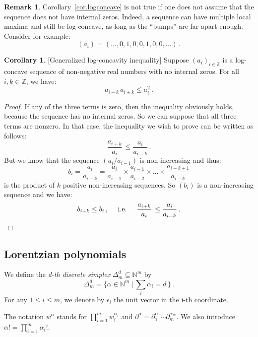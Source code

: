 \documentclass[12pt,reqno]{amsart}
\theoremstyle{definition}
\newtheorem{remark}[theorem]{Remark}
\newtheorem{corollary}[theorem]{Corollary}
\begin{document}
\begin{remark}
    Corollary~\ref{cor.logconcave} is not true if one does not assume that the sequence does not have internal zeros. Indeed, a sequence can have multiple local maxima and still be log-concave, as long as the ``bumps'' are far apart enough. Consider for example:
    $$
    (a_{i}) = ( \ldots , 0, 1 , 0 , 0 , 1 , 0 , 0 , \ldots )\,.
    $$
\end{remark}

\begin{corollary}\label{generalizedlogconcavity}[Generalized log-concavity inequality]
    Suppose $(a_{i})_{i \in \mathbb{Z}}$ is a log-concave sequence of non-negative real numbers with no internal zeros. For all $i,k \in \mathbb{Z}$, we have:
    $$
    a_{i-k} \, a_{i+k} \leq a_i^2\,.
    $$
\end{corollary}

\begin{proof}
   If any of the three terms is zero, then the inequality obviously holds, because the sequence has no internal zeros. So we can suppose that all three terms are nonzero. In that case, the inequality we wish to prove can be written as follows:
   $$
    \frac{ a_{i+k}}{a_i} \, \leq \frac{a_i}{a_{i-k}}\,.
    $$
But we know that the sequence $(a_i/a_{i-1})$ is non-increasing and thus:
$$
 b_i = \frac{ a_{i}}{a_{i-k}} = \frac{ a_{i}}{a_{i-1}} \times \frac{ a_{i-1}}{a_{i-2}} \times \ldots \times \frac{ a_{i-k+1}}{a_{i-k}}
$$
is the product of $k$ positive non-increasing sequences. So $(b_i)$ is a non-increasing sequence and we have:
\[b_{i+k} \leq b_i \,, \quad \text{ i.e. } \quad \frac{ a_{i+k}}{a_i} \, \leq \frac{a_i}{a_{i-k}}\,.\qedhere\]
\end{proof}

\subsection{Lorentzian polynomials}
We define the \emph{d-th discrete simplex} $\Delta_{m}^{d} \subseteq \mathbb{N}^{m}$ by
$$
\Delta_{m}^{d} = \lbrace{ \alpha \in \mathbb{N}^{m}~\vert~\sum_{i} \alpha_{i} = d \, \rbrace}\,.
$$
For any $1 \leq i \leq m$, we denote by $\epsilon_{i}$ the unit vector in the i-th coordinate.
\par
The notation $w^{\alpha}$ stands for $\prod\limits_{i=1}^{m} w_{i}^{\alpha_{i}}$ and $\partial^{\alpha}=\partial_{1}^{\alpha_{1}}\cdots \partial_{m}^{\alpha_{m}}$. We also introduce $\alpha!=\prod\limits_{i=1}^{m}\alpha_{i}!$.
\end{document}

